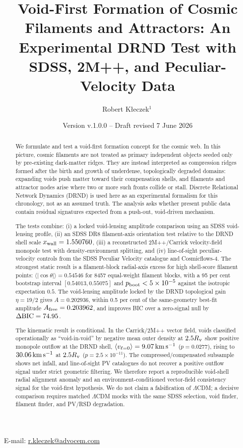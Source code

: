 \documentclass[11pt,a4paper]{article}
\title{Void-First Formation of Cosmic Filaments and Attractors: An Experimental DRND Test with SDSS, 2M++, and Peculiar-Velocity Data}
\author{Robert K\l{}eczek$^{1}$\,\orcidlink{0009-0009-9774-0446}}
\affil{$^{1}$Independent Researcher}
\date{Version v.1.0.0 -- Draft revised 7 June 2026}
\begin{document}
\maketitle

E-mail: \href{mailto:r.kleczek@advocem.com}{r.kleczek@advocem.com}

\begin{abstract}
We formulate and test a void-first formation concept for the cosmic web. In this picture, cosmic filaments are not treated as primary independent objects seeded only by pre-existing dark-matter ridges. They are instead interpreted as compression ridges formed after the birth and growth of underdense, topologically degraded domains: expanding voids push matter toward their compensation shells, and filaments and attractor nodes arise where two or more such fronts collide or stall. Discrete Relational Network Dynamics (DRND) is used here as an experimental formalism for this chronology, not as an assumed truth. The analysis asks whether present public data contain residual signatures expected from a push-out, void-driven mechanism.

The tests combine: (i) a locked void-lensing amplitude comparison using an SDSS void-lensing profile, (ii) an SDSS DR8 filament-axis orientation test relative to the DRND shell scale $x_{\rm wall}=1.550760$, (iii) a reconstructed 2M++/Carrick velocity-field monopole test with density-environment splitting, and (iv) line-of-sight peculiar-velocity controls from the SDSS Peculiar Velocity catalogue and Cosmicflows-4. The strongest static result is a filament-block radial-axis excess for high shell-score filament points: $\langle |\cos\theta| \rangle=0.54546$ for 8457 equal-weight filament blocks, with a 95 per cent bootstrap interval $[0.54013,0.55075]$ and $p_{\rm boot}<5\times10^{-5}$ against the isotropic expectation $0.5$. The void-lensing amplitude locked by the DRND topological gain $\eta=19/2$ gives $A=0.202936$, within 0.5 per cent of the same-geometry best-fit amplitude $A_{\rm free}=0.203962$, and improves BIC over a zero-signal null by $\Delta{\rm BIC}=74.95$.

The kinematic result is conditional. In the Carrick/2M++ vector field, voids classified operationally as ``void-in-void'' by negative mean outer density at $2.5R_{\rm v}$ show positive monopole outflow at the DRND shell, $\langle v_{\ell=0}\rangle=9.07\,{\rm km\,s^{-1}}$ ($p=0.0277$), rising to $30.06\,{\rm km\,s^{-1}}$ at $2.5R_{\rm v}$ ($p=2.5\times10^{-11}$). The compressed/compensated subsample shows net infall, and line-of-sight PV catalogues do not recover a positive outflow signal under strict geometric filtering. We therefore report a reproducible void-shell radial alignment anomaly and an environment-conditioned vector-field consistency signal for the void-first hypothesis. We do not claim a falsification of $\Lambda$CDM; a decisive comparison requires matched $\Lambda$CDM mocks with the same SDSS selection, void finder, filament finder, and PV/RSD degradation.
\end{abstract}
\end{document}

